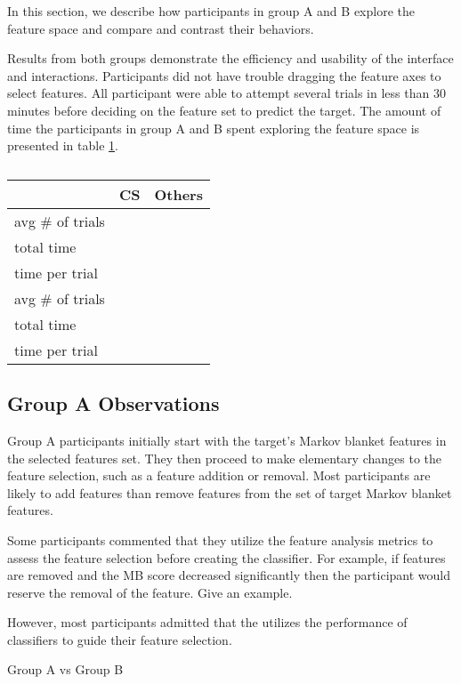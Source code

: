 In this section, we describe how participants in group A and B explore the feature space and compare and contrast their behaviors.

Results from both groups demonstrate the efficiency and usability of the interface and interactions. Participants did not have trouble dragging the feature axes to select features. All participant were able to attempt several trials in less than 30 minutes before deciding on the feature set to predict the target. The amount of time the participants in group A and B spent exploring the feature space is presented in table \ref{versionAvsversionB}.

\begin{table}[]
\centering
\begin{tabular}{lcc}
\hline
                 & CS & Others \\ \hline
avg \# of trials &    &        \\
total time       &    &        \\
time per trial   &    &        \\ \hline
avg \# of trials &    &        \\
total time       &    &        \\
time per trial   &    &        \\ \hline
\end{tabular}
\caption{}
\label{versionAvsversionB}
\end{table}

\subsection { Group A Observations}
Group A participants initially start with the target’s Markov blanket features in the selected features set. They then proceed to make elementary changes to the feature selection, such as a feature addition or removal. Most participants are likely to add features than remove features from the set of target Markov blanket features. 


Some participants commented that they utilize the feature analysis metrics to assess the feature selection before creating the classifier. For example, if features are removed and the MB score decreased significantly then the participant would reserve the removal of the feature. Give an example. 


However, most participants admitted that the utilizes the performance of classifiers to guide their feature selection.


Group A vs Group B

